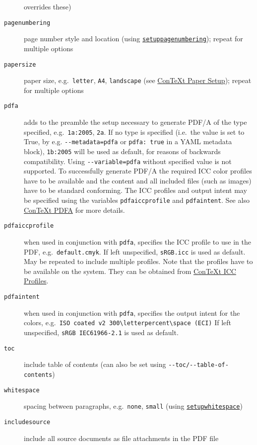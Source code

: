 \documentclass[]{article}
\begin{document}
\begin{description}
overrides these)
\item[\texttt{pagenumbering}]
page number style and location (using
\href{https://wiki.contextgarden.net/Command/setuppagenumbering}{\texttt{setuppagenumbering}});
repeat for multiple options
\item[\texttt{papersize}]
paper size, e.g.~\texttt{letter}, \texttt{A4}, \texttt{landscape} (see
\href{https://wiki.contextgarden.net/PaperSetup}{ConTeXt Paper Setup});
repeat for multiple options
\item[\texttt{pdfa}]
adds to the preamble the setup necessary to generate PDF/A of the type
specified, e.g.~\texttt{1a:2005}, \texttt{2a}. If no type is specified
(i.e.~the value is set to True, by e.g. \texttt{-\/-metadata=pdfa} or
\texttt{pdfa:\ true} in a YAML metadata block), \texttt{1b:2005} will be
used as default, for reasons of backwards compatibility. Using
\texttt{-\/-variable=pdfa} without specified value is not supported. To
successfully generate PDF/A the required ICC color profiles have to be
available and the content and all included files (such as images) have
to be standard conforming. The ICC profiles and output intent may be
specified using the variables \texttt{pdfaiccprofile} and
\texttt{pdfaintent}. See also
\href{https://wiki.contextgarden.net/PDF/A}{ConTeXt PDFA} for more
details.
\item[\texttt{pdfaiccprofile}]
when used in conjunction with \texttt{pdfa}, specifies the ICC profile
to use in the PDF, e.g.~\texttt{default.cmyk}. If left unspecified,
\texttt{sRGB.icc} is used as default. May be repeated to include
multiple profiles. Note that the profiles have to be available on the
system. They can be obtained from
\href{https://wiki.contextgarden.net/PDFX\#ICC_profiles}{ConTeXt ICC
Profiles}.
\item[\texttt{pdfaintent}]
when used in conjunction with \texttt{pdfa}, specifies the output intent
for the colors,
e.g.~\texttt{ISO\ coated\ v2\ 300\textbackslash{}letterpercent\textbackslash{}space\ (ECI)}
If left unspecified, \texttt{sRGB\ IEC61966-2.1} is used as default.
\item[\texttt{toc}]
include table of contents (can also be set using
\texttt{-\/-toc/-\/-table-of-contents})
\item[\texttt{whitespace}]
spacing between paragraphs, e.g.~\texttt{none}, \texttt{small} (using
\href{https://wiki.contextgarden.net/Command/setupwhitespace}{\texttt{setupwhitespace}})
\item[\texttt{includesource}]
include all source documents as file attachments in the PDF file
\end{description}
\end{document}
